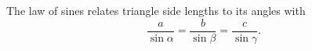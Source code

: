 The law of sines relates triangle side lengths to its angles with
\[
  \frac{a}{\sin\alpha}
  =
  \frac{b}{\sin\beta}
  =
  \frac{c}{\sin\gamma}.
\]